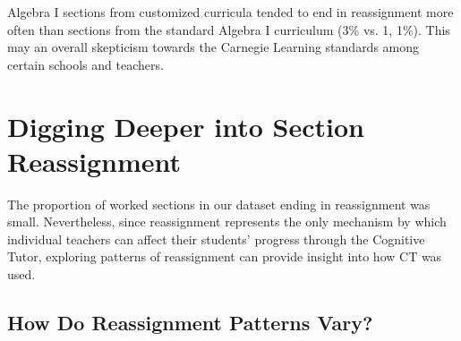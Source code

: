 \documentclass[12pt]{article}\usepackage[]{graphicx}\usepackage[]{color}
\begin{document}
Algebra I sections from customized curricula tended to end in
reassignment more often than sections from the standard Algebra I
curriculum (3\% vs.
1, 1\%).
This may an overall skepticism towards the Carnegie Learning standards
among certain schools and teachers.




\section{Digging Deeper into Section Reassignment}\label{sec:cp}
The proportion of worked sections in our dataset ending in
reassignment was small.
Nevertheless, since reassignment represents the only mechanism by
which individual teachers can affect their students' progress through
the Cognitive Tutor, exploring patterns of reassignment can provide
insight into how CT was used.



\subsection{How Do Reassignment Patterns Vary?}
\end{document}
